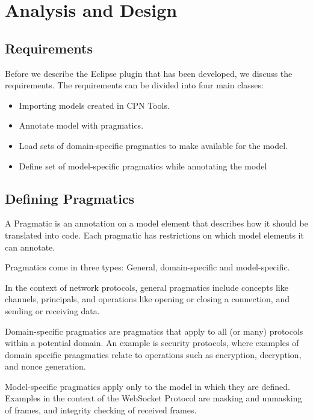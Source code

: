 \chapter{Analysis and Design}
\label{chap:analysis}

\section{Requirements} 
Before we describe the Eclipse plugin that has been developed, we discuss the
requirements.
The requirements can be divided into four main classes:

\begin{itemize} 
	\item Importing models created in CPN Tools. 

	\item Annotate model with pragmatics. 
		
	\item Load sets of domain-specific pragmatics to make available for the model.
	
	\item Define set of model-specific pragmatics while annotating the model

\end{itemize}

\section{Defining Pragmatics}

A Pragmatic is an annotation on a model element that describes how it should be
translated into code. Each pragmatic has restrictions on which model elements it
can annotate.

Pragmatics come in three types: General, domain-specific and model-specific.

In the context of network protocols, general pragmatics include concepts
like channels, principals, and operations like opening or closing a connection,
and sending or receiving data. 

Domain-specific pragmatics are pragmatics that apply to all (or many) protocols
within a potential domain. An example is security protocols, where examples of
domain specific praagmatics relate to operations such as encryption, decryption,
and nonce generation.

Model-specific pragmatics apply only to the model in which they are defined.
Examples in the context of the WebSocket Protocol are masking and unmasking of
frames, and integrity checking of received frames.

